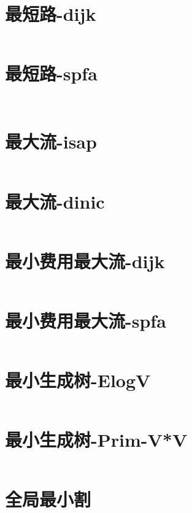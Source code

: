 \documentclass[titlepage,landscape,a4paper,10pt]{article}
\begin{document}
\begin{multicols}{2}
\begin{spacing}{0.8}
\section{最短路-dijk}
\inputminted{cpp}{/Users/Corn/Desktop/Code/ACM_SCL/code/dijk.cpp}

\section{最短路-spfa}
\inputminted{cpp}{/Users/Corn/Desktop/Code/ACM_SCL/code/spfa.cpp}

\inputminted{text}{/Users/Corn/Desktop/Code/ACM_SCL/extra/flow.txt}

\section{最大流-isap}
\inputminted{cpp}{/Users/Corn/Desktop/Code/ACM_SCL/code/maxflow_isap.cpp}

\section{最大流-dinic}
\inputminted{cpp}{/Users/Corn/Desktop/Code/ACM_SCL/code/maxflow_dinic.cpp}

\section{最小费用最大流-dijk}
\inputminted{cpp}{/Users/Corn/Desktop/Code/ACM_SCL/code/mcmf_dijk.cpp}

\section{最小费用最大流-spfa}
\inputminted{cpp}{/Users/Corn/Desktop/Code/ACM_SCL/code/mcmf_spfa.cpp}

\section{最小生成树-ElogV}
\inputminted{cpp}{/Users/Corn/Desktop/Code/ACM_SCL/code/kruskal.cpp}

\section{最小生成树-Prim-V*V}
\inputminted{cpp}{/Users/Corn/Desktop/Code/ACM_SCL/code/prim.cpp}

\section{全局最小割}
\inputminted{cpp}{/Users/Corn/Desktop/Code/ACM_SCL/code/global-min_cut.cpp}


\end{spacing}
\end{multicols}
\end{document}
